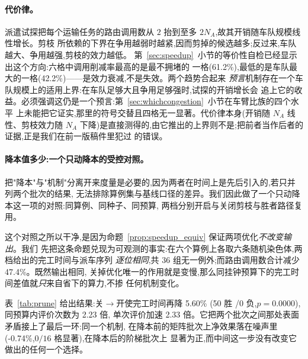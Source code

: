\documentclass[manuscript,screen,review]{acmart}
\newcommand{\RouteCallCutLo}{42.2\%}     %
\newcommand{\RouteCallCutHi}{61.2\%}     %
\newcommand{\SpeedupProbe}{2.33}
\newcommand{\RouteCallCut}{47.4\%}
\newcommand{\GainPrune}{5.60\%}
\newcommand{\PPrune}{0.0000}
\newcommand{\WinPrune}{50}
\newcommand{\LosePrune}{0}
\newcommand{\EvalRatioPrune}{2.23}
\newcommand{\GainProbePre}{-0.74\%}      %
\begin{document}
\paragraph{代价律。}
派遣试探把每个运输任务的路由调用数从 $2$ 抬到至多 $2N_A$,故其开销随车队规模线性增长。剪枝
所依赖的下界在争用越弱时越紧,因而剪掉的候选越多;反过来,车队越大、争用越强,剪枝的效力越低。
第~\ref{sec:speedup}~小节的等价性自检已经显示出这个方向:六格中调用削减率最高的是最不拥堵的
一格(\RouteCallCutHi{}),最低的是车队最大的一格(\RouteCallCutLo{})——是效力衰减,不是失效。两个趋势合起来
\emph{预言}机制存在一个车队规模上的适用上界:在车队足够大且争用足够强时,试探的开销增长会
追上它的收益。必须强调这仍是一个预言:第~\ref{sec:whichcongestion}~小节在车臂比族的四个水平
上未能把它证实,那里的符号交替且四格无一显著。代价律本身(开销随 $N_A$ 线性、剪枝效力随 $N_A$
下降)是直接测得的,由它推出的上界则不是;把前者当作后者的证据,正是我们在前一版稿件里犯过
的错误。

\paragraph{降本值多少:一个只动降本的受控对照。}
把"降本"与"机制"分离开来度量是必要的,因为两者在时间上是先后引入的,若只并列两个批次的结果,
无法排除算例集与基线口径的差异。我们因此做了一个只动降本这一项的对照:同算例、同种子、同预算,
两档分别开启与关闭剪枝与胜者路径复用。

这个对照之所以干净,是因为命题~\ref{prop:speedup_equiv} 保证两项优化\emph{不改变输出}。我们
先把这条命题兑现为可观测的事实:在六个算例上各取六条随机染色体,两档给出的完工时间与派车序列
\emph{逐位相同},共 $36$ 组无一例外;而路由调用数合计减少 \RouteCallCut{}。既然输出相同,
关掉优化唯一的作用就是变慢,那么同挂钟预算下的完工时间差值就\emph{只}来自省下的算力,不掺
任何机制变化。

表~\ref{tab:prune} 给出结果:关$\to$开使完工时间再降 \GainPrune{}
(\WinPrune{} 胜 /\LosePrune{} 负,$p=\PPrune$),同预算内评价次数为 \EvalRatioPrune{} 倍,
单次评价加速 \SpeedupProbe{} 倍。它把两个批次之间那处表面矛盾接上了最后一环:同一个机制,
在降本前的矩阵批次上净效果落在噪声里(\GainProbePre{},$0/16$ 格显著),在降本后的阶梯批次上
显著为正,而中间这一步没有改变它做出的任何一个选择。

\begin{table}[t]
\caption{只改变剪枝与胜者路径复用的受控对照。两档输出逐位相同(已过等价性自检),故差值只来自
省下的算力。同算例、同种子、同挂钟预算;$n=60$ 配对。}
\label{tab:prune}
\small

\end{table}
\end{document}
